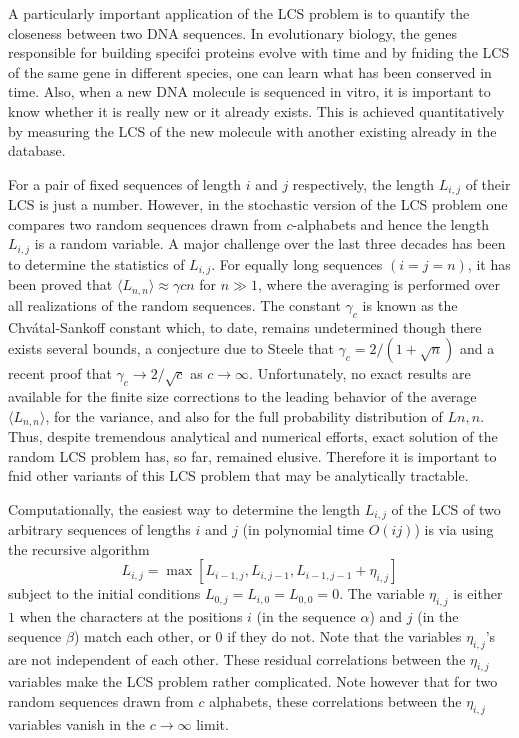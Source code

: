 A particularly important application of the LCS problem is to quantify the closeness between two DNA sequences. In evolutionary biology, the genes responsible for building specifci proteins evolve with time and by fniding the LCS of the same gene in different species, one can learn what has been conserved in time. Also, when a new DNA molecule is sequenced in vitro, it is important to know whether it is really new or it already exists. This is achieved quantitatively by measuring the LCS of the new molecule with another existing already in the database. 

For a pair of fixed sequences of length $i$ and $j$ respectively, the length $L_{i,j}$ of their LCS is just a number. However, in the stochastic version of the LCS problem one compares two random sequences drawn from $c$-alphabets and hence the length $L_{i,j}$ is a random variable. A major challenge over the last three decades has been to determine the statistics of $L_{i,j}$. For equally long sequences $(i = j = n)$, it has been proved that $\langle L_{n,n} \rangle \approx \gamma c n$ for $n \gg 1$, where the averaging is performed over all realizations of the random sequences. The constant $\gamma_c$ is known as the Chvátal-Sankoff constant which, to date, remains undetermined though there exists several bounds, a conjecture due to Steele that $\gamma_c = 2 / (1 + \sqrt{n})$ and a recent proof that $\gamma_c \rightarrow 2 / \sqrt{c} $ as $c \rightarrow \infty$. Unfortunately, no exact results are available for the finite size corrections to the leading behavior of the average $\langle L_{n,n} \rangle$, for the variance, and also for the full probability distribution of $L{n,n}$. Thus, despite tremendous analytical and numerical efforts, exact solution of the random LCS problem has, so far, remained elusive. Therefore it is important to fnid other variants of this LCS problem that may be analytically tractable. 

Computationally, the easiest way to determine the length $L_{i,j}$ of the LCS of two arbitrary sequences of lengths $i$ and $j$ (in polynomial time $O(ij)$) is via using the recursive algorithm
\begin{equation}
	 L_{i,j} = \max[L_{i-1,j}, L_{i,j-1}, L_{i-1,j-1}+ \eta_{i,j}] 
\end{equation}
 subject to the initial conditions $L_{0,j} = L_{i,0} = L_{0,0} = 0$. The variable $\eta_{i,j}$ is either $1$ when the characters at the positions $i$ (in the sequence $\alpha$) and $j$ (in the sequence $\beta$) match each other, or $0$ if they do not. Note that the variables $\eta_{i,j}$’s are not independent of each other. These residual correlations between the $\eta_{i,j}$ variables make the LCS problem rather complicated. Note however that for two random sequences drawn from $c$ alphabets, these correlations between the $\eta_{i,j}$ variables vanish in the $c \rightarrow \infty$ limit. 

